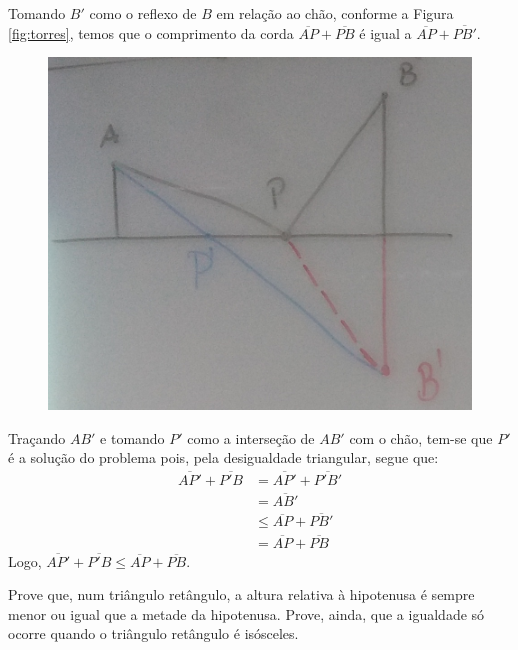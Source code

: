\begin{solution}
Tomando $B'$ como o reflexo de $B$ em relação ao chão, conforme a Figura \ref{fig:torres}, temos que o comprimento da corda $\overline{AP} + \overline{PB}$ é igual a $\overline{AP} + \overline{PB'}$. 

\label{fig:torres}
\begin{figure}[H]
\includegraphics[scale=0.25]{../../res/img/fig-c03-ex29.png}
\centering
\end{figure}

Traçando $AB'$ e tomando $P'$ como a interseção de $AB'$ com o chão, tem-se que $P'$ é a solução do problema pois, pela desigualdade triangular, segue que:
%
\begin{align*}
\overline{AP'} +\overline{P'B} & = \overline{AP'} +\overline{P'B'} \\
& = \overline{AB'} \\
& \le \overline{AP} +\overline{PB'} \\
& = \overline{AP} +\overline{PB} 
\end{align*}
%
Logo, $\overline{AP'} +\overline{P'B} \le \overline{AP} +\overline{PB}$.
\end{solution}

\begin{example}
Prove que, num triângulo retângulo, a altura relativa à hipotenusa é sempre menor ou igual que a metade da hipotenusa. Prove, ainda, que
a igualdade só ocorre quando o triângulo retângulo é isósceles.
\end{example}

